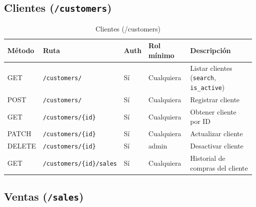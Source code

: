 \subsection{\texorpdfstring{Clientes (\texttt{/customers})}{Clientes (/customers)}}\label{clientes-customers}

\begin{longtable}[]{@{}
  >{\raggedright\arraybackslash}p{}
  >{\raggedright\arraybackslash}p{}
  >{\raggedright\arraybackslash}p{}
  >{\raggedright\arraybackslash}p{}
  >{\raggedright\arraybackslash}p{}@{}}
\caption[Clientes (/customers)]{Clientes (/customers)}\tabularnewline
\toprule\noalign{}
\begin{minipage}[b]{\linewidth}\raggedright
Método
\end{minipage} & \begin{minipage}[b]{\linewidth}\raggedright
Ruta
\end{minipage} & \begin{minipage}[b]{\linewidth}\raggedright
Auth
\end{minipage} & \begin{minipage}[b]{\linewidth}\raggedright
Rol mínimo
\end{minipage} & \begin{minipage}[b]{\linewidth}\raggedright
Descripción
\end{minipage} \\
\midrule\noalign{}
\endhead
\bottomrule\noalign{}
\endlastfoot
GET & \texttt{/customers/} & Sí & Cualquiera & Listar clientes (\texttt{search}, \texttt{is\_active}) \\
POST & \texttt{/customers/} & Sí & Cualquiera & Registrar cliente \\
GET & \texttt{/customers/\{id\}} & Sí & Cualquiera & Obtener cliente por ID \\
PATCH & \texttt{/customers/\{id\}} & Sí & Cualquiera & Actualizar cliente \\
DELETE & \texttt{/customers/\{id\}} & Sí & admin & Desactivar cliente \\
GET & \texttt{/customers/\{id\}/sales} & Sí & Cualquiera & Historial de compras del cliente \\
\end{longtable}

\subsection{\texorpdfstring{Ventas (\texttt{/sales})}{Ventas (/sales)}}\label{ventas-sales}

